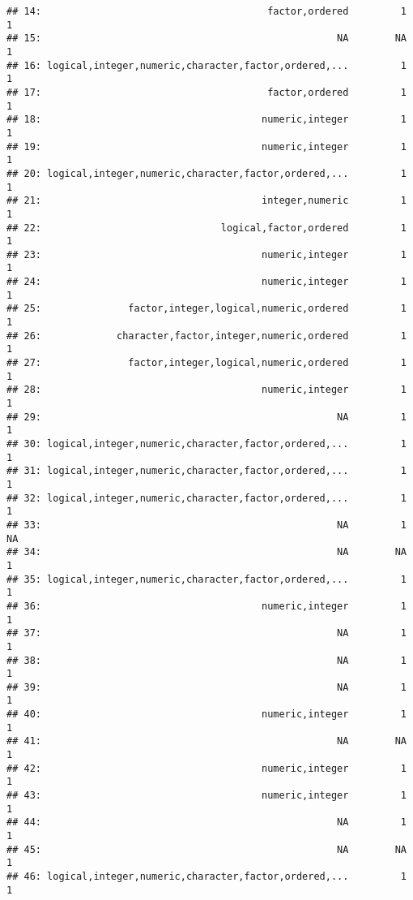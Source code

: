 \documentclass[
]{scrbook}
\begin{document}
\begin{verbatim}
## 14:                                       factor,ordered         1          1
## 15:                                                   NA        NA          1
## 16: logical,integer,numeric,character,factor,ordered,...         1          1
## 17:                                       factor,ordered         1          1
## 18:                                      numeric,integer         1          1
## 19:                                      numeric,integer         1          1
## 20: logical,integer,numeric,character,factor,ordered,...         1          1
## 21:                                      integer,numeric         1          1
## 22:                               logical,factor,ordered         1          1
## 23:                                      numeric,integer         1          1
## 24:                                      numeric,integer         1          1
## 25:               factor,integer,logical,numeric,ordered         1          1
## 26:             character,factor,integer,numeric,ordered         1          1
## 27:               factor,integer,logical,numeric,ordered         1          1
## 28:                                      numeric,integer         1          1
## 29:                                                   NA         1          1
## 30: logical,integer,numeric,character,factor,ordered,...         1          1
## 31: logical,integer,numeric,character,factor,ordered,...         1          1
## 32: logical,integer,numeric,character,factor,ordered,...         1          1
## 33:                                                   NA         1         NA
## 34:                                                   NA        NA          1
## 35: logical,integer,numeric,character,factor,ordered,...         1          1
## 36:                                      numeric,integer         1          1
## 37:                                                   NA         1          1
## 38:                                                   NA         1          1
## 39:                                                   NA         1          1
## 40:                                      numeric,integer         1          1
## 41:                                                   NA        NA          1
## 42:                                      numeric,integer         1          1
## 43:                                      numeric,integer         1          1
## 44:                                                   NA         1          1
## 45:                                                   NA        NA          1
## 46: logical,integer,numeric,character,factor,ordered,...         1          1

\end{verbatim}
\end{document}
